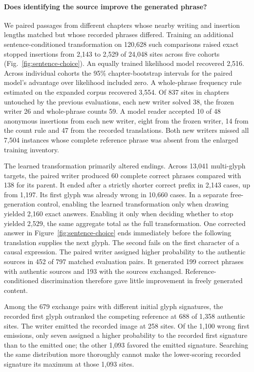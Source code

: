\paragraph{Does identifying the source improve the generated phrase?}
We paired passages from different chapters whose nearby writing and insertion lengths matched but whose recorded phrases differed. Training an additional sentence-conditioned transformation on 120,628 such comparisons raised exact stopped insertions from 2,143 to 2,529 of 24,048 sites across five cohorts (Fig.~\ref{fig:sentence-choice}). An equally trained likelihood model recovered 2,516. Across individual cohorts the 95\% chapter-bootstrap intervals for the paired model's advantage over likelihood included zero. A whole-phrase frequency rule estimated on the expanded corpus recovered 3,554. Of 837 sites in chapters untouched by the previous evaluations, each new writer solved 38, the frozen writer 26 and whole-phrase counts 59. A model reader accepted 10 of 48 anonymous insertions from each new writer, eight from the frozen writer, 14 from the count rule and 47 from the recorded translations. Both new writers missed all 7,504 instances whose complete reference phrase was absent from the enlarged training inventory.

The learned transformation primarily altered endings. Across 13,041 multi-glyph targets, the paired writer produced 60 complete correct phrases compared with 138 for its parent. It ended after a strictly shorter correct prefix in 2,143 cases, up from 1,197. Its first glyph was already wrong in 10,660 cases. In a separate free-generation control, enabling the learned transformation only when drawing yielded 2,160 exact answers. Enabling it only when deciding whether to stop yielded 2,529, the same aggregate total as the full transformation. One corrected answer in Figure~\ref{fig:sentence-choice} ends immediately before the following translation supplies the next glyph. The second fails on the first character of a causal expression. The paired writer assigned higher probability to the authentic sources in 452 of 797 matched evaluation pairs. It generated 199 correct phrases with authentic sources and 193 with the sources exchanged. Reference-conditioned discrimination therefore gave little improvement in freely generated content.

Among the 679 exchange pairs with different initial glyph signatures, the recorded first glyph outranked the competing reference at 688 of 1,358 authentic sites. The writer emitted the recorded image at 258 sites. Of the 1,100 wrong first emissions, only seven assigned a higher probability to the recorded first signature than to the emitted one; the other 1,093 favored the emitted signature. Searching the same distribution more thoroughly cannot make the lower-scoring recorded signature its maximum at those 1,093 sites.

